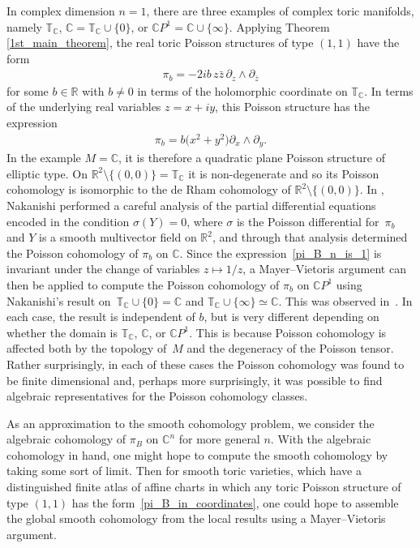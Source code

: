 \documentclass[10pt,a4paper]{amsart}
\numberwithin{equation}{section}
\begin{document}
In complex dimension $n=1$, there are three examples of complex toric manifolds, namely ${\mathbb T}_{\mathbb C}$, ${\mathbb C}={\mathbb T}_{\mathbb C}\cup\{0\}$, or ${\mathbb C} P^1={\mathbb C}\cup\{\infty\}$. Applying Theorem \ref{1st_main_theorem}, the real toric Poisson structures of type $(1,1)$ have the form
\begin{gather}\label{pi_B_n_is_1}
\pi_b=-2ib\,z\bar{z}\,\partial_{z}\wedge\partial_{\bar{z}}
\end{gather}
for some $b\in{\mathbb R}$ with $b\not=0$ in terms of the holomorphic coordinate on ${\mathbb T}_{\mathbb C}$. In terms of the underlying real variables $z=x+iy$, this Poisson structure has the expression
\begin{gather*}
\pi_b=b\big(x^2+y^2\big)\partial_x\wedge\partial_y.
\end{gather*}
In the example $M={\mathbb C}$, it is therefore a quadratic plane Poisson structure of elliptic type. On ${\mathbb R}^2\setminus\{(0,0)\}={\mathbb T}_{\mathbb C}$ it is non-degenerate and so its Poisson cohomology is isomorphic to the de Rham cohomology
of ${\mathbb R}^2\setminus\{(0,0)\}$. In \cite{Nakanishi}, Nakanishi performed a careful analysis of the partial dif\/ferential equations encoded in the condition $\sigma(Y)=0$, where $\sigma$ is the Poisson dif\/ferential for~$\pi_b$ and $Y$ is a smooth multivector f\/ield on ${\mathbb R}^2$, and through that analysis determined the Poisson cohomology of $\pi_b$ on ${\mathbb C}$. Since the expression~\eqref{pi_B_n_is_1} is invariant under the change of variables $z\mapsto 1/z$, a Mayer--Vietoris argument can then be applied to compute the Poisson cohomology of $\pi_b$ on ${\mathbb C} P^1$ using Nakanishi's result on~${\mathbb T}_{\mathbb C}\cup\{0\}={\mathbb C}$ and ${\mathbb T}_{\mathbb C}\cup\{\infty\}\simeq {\mathbb C}$. This was observed in~\cite{Caine}. In each case, the result is independent of $b$, but is very dif\/ferent depending on whether the domain is ${\mathbb T}_{\mathbb C}$, ${\mathbb C}$, or ${\mathbb C} P^1$.
This is because Poisson cohomology is af\/fected both by the topology of~$M$ and the degeneracy of the Poisson tensor. Rather surprisingly, in each of these cases the Poisson cohomology was found to be f\/inite dimensional and, perhaps more surprisingly, it was possible to f\/ind algebraic representatives for the Poisson cohomology classes.

As an approximation to the smooth cohomology problem, we consider the algebraic coho\-mology of $\pi_B$ on ${\mathbb C}^n$ for more general $n$. With the algebraic cohomology in hand, one might hope to compute the smooth cohomology by taking some sort of limit. Then for smooth toric varieties, which have a distinguished f\/inite atlas of af\/f\/ine charts in which any toric Poisson structure of type $(1,1)$ has the form~\eqref{pi_B_in_coordinates}, one could hope to assemble the global smooth cohomology from the local results using a Mayer--Vietoris argument.
\end{document}
